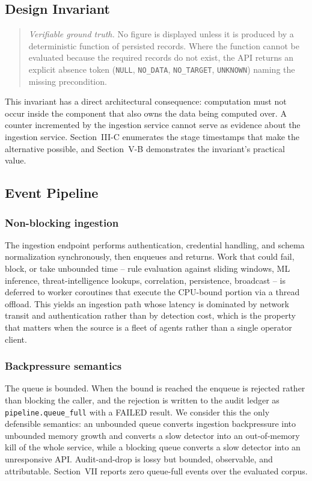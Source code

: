 \documentclass[conference]{IEEEtran}
\begin{document}
\subsection{Design Invariant}

\begin{quote}
\emph{Verifiable ground truth.} No figure is displayed unless it is produced
by a deterministic function of persisted records. Where the function cannot
be evaluated because the required records do not exist, the API returns an
explicit absence token (\texttt{NULL}, \texttt{NO\_DATA},
\texttt{NO\_TARGET}, \texttt{UNKNOWN}) naming the missing precondition.
\end{quote}

This invariant has a direct architectural consequence: computation must not
occur inside the component that also owns the data being computed over.
A counter incremented by the ingestion service cannot serve as evidence about
the ingestion service. Section~III-C enumerates the stage timestamps that make
the alternative possible, and Section~V-B demonstrates the invariant's
practical value.

\subsection{Event Pipeline}

\subsubsection{Non-blocking ingestion}

The ingestion endpoint performs authentication, credential handling, and
schema normalization synchronously, then enqueues and returns. Work that
could fail, block, or take unbounded time -- rule evaluation against sliding
windows, ML inference, threat-intelligence lookups, correlation, persistence,
broadcast -- is deferred to worker coroutines that execute the
CPU-bound portion via a thread offload. This yields an ingestion path whose
latency is dominated by network transit and authentication rather than by
detection cost, which is the property that matters when the source is a
fleet of agents rather than a single operator client.

\subsubsection{Backpressure semantics}

The queue is bounded. When the bound is reached the enqueue is rejected
rather than blocking the caller, and the rejection is written to the
audit ledger as \texttt{pipeline.queue\_full} with a FAILED result. We
consider this the only defensible semantics: an unbounded queue converts
ingestion backpressure into unbounded memory growth and converts a slow
detector into an out-of-memory kill of the whole service, while a blocking
queue converts a slow detector into an unresponsive API. Audit-and-drop is
lossy but bounded, observable, and attributable. Section~VII reports zero
queue-full events over the evaluated corpus.
\end{document}
